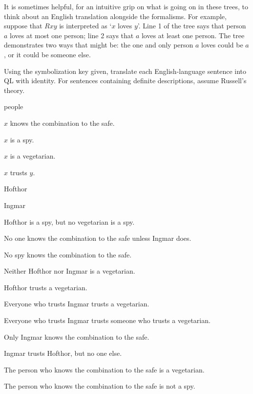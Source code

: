It is sometimes helpful, for an intuitive grip on what is going on in these trees, to think about an English translation alongside the formalisms. For example, suppose that $Rxy$ is interpreted as `$x$ loves $y$'. Line 1 of the tree says that person $a$ loves at most one person; line 2 says that $a$ loves at least one person. The tree demonstrates two ways that might be: the one and only person $a$ loves could be $a$, or it could be someone else.


\practiceproblems

\solutions
\problempart
\label{pr.QL-ID-spies}
Using the symbolization key given, translate each English-language sentence into QL with identity. For sentences containing definite descriptions, assume Russell's theory.
\begin{ekey}
\item[UD:] people
\item[Kx:] $x$ knows the combination to the safe.
\item[Sx:] $x$ is a spy.
\item[Vx:] $x$ is a vegetarian.
\item[Txy:] $x$ trusts $y$.
\item[h:] Hofthor
\item[i:] Ingmar
\end{ekey}
\begin{earg}
\item Hofthor is a spy, but no vegetarian is a spy.
\item No one knows the combination to the safe unless Ingmar does.
\item No spy knows the combination to the safe.
\item Neither Hofthor nor Ingmar is a vegetarian.
\item Hofthor trusts a vegetarian.
\item Everyone who trusts Ingmar trusts a vegetarian.
\item Everyone who trusts Ingmar trusts someone who trusts a vegetarian.
\item Only Ingmar knows the combination to the safe.
\item Ingmar trusts Hofthor, but no one else.
\item The person who knows the combination to the safe is a vegetarian.
\item The person who knows the combination to the safe is not a spy.
\end{earg}

